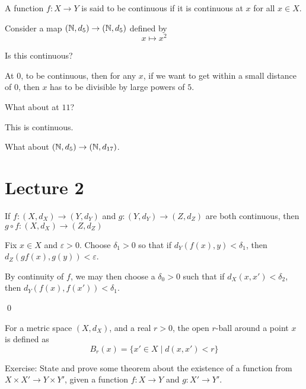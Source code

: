 \documentclass[x11names,reqno,14pt]{extarticle}
\begin{document}
A function $f:X\to Y$ is said to be continuous if it is continuous at $x$ for all $x \in X$. 

\exm

Consider a map $(\mathbb{N}, d_5) \to (\mathbb{N}, d_5)$ defined by 
\[
x\mapsto x^2
\]

Is this continuous? 

At 0, to be continuous, then for any $x$, if we want to get within a small distance of 0, then $x$ has to be divisible by large powers of $5$. 

What about at $11$?

This is continuous. 

\exm

What about $(\mathbb{N},d_5) \to (\mathbb{N}, d_{17})$. 

\section*{Lecture 2}

\thm

If $f:(X, d_X)\to (Y, d_Y)$ and $g:(Y, d_Y)\to(Z, d_Z)$ are both continuous, then $g \circ f:(X, d_X)\to(Z, d_Z)$

\proof

Fix $x \in X$ and $\varepsilon>0$. Choose $\delta_1 > 0$ so that if $d_Y(f(x), y) < \delta_1$, then $d_Z(gf(x), g(y)) < \varepsilon$. 

By continuity of $f$, we may then choose a $\delta_0 > 0$ such that if $d_X(x, x') < \delta_2$, then $d_Y(f(x), f(x')) < \delta_1$. 

\qed

 For a metric space $(X, d_X)$, and a real $r > 0$, the open $r$-ball around a point $x$ is defined as
\[
B_r(x) = \{x' \in X \mid d(x, x') < r\}
\]

Exercise: State and prove some theorem about the existence of a function from $X \times X' \to Y \times Y'$, given a function $f:X\to Y$ and $g:X'\to Y'$. 

\end{document}
